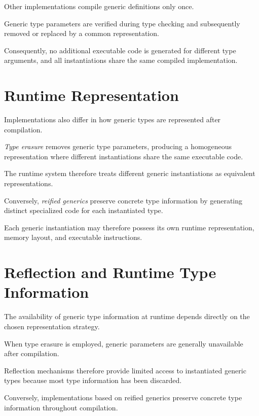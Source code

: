 \documentclass[11pt]{report}
\begin{document}
Other implementations compile generic definitions only once.

Generic type parameters are verified during type checking and subsequently
removed or replaced by a common representation.

Consequently, no additional executable code is generated for different type
arguments, and all instantiations share the same compiled implementation.




\section{Runtime Representation}
\label{Introduction:RuntimeRepresentation}

Implementations also differ in how generic types are represented after
compilation.

\emph{Type erasure} removes generic type parameters, producing a homogeneous
representation where different instantiations share the same executable code.

The runtime system therefore treats different generic instantiations as
equivalent representations.


Conversely, \emph{reified generics} preserve concrete type information by
generating distinct specialized code for each instantiated type.

Each generic instantiation may therefore possess its own runtime
representation, memory layout, and executable instructions.

\label{Introduction: Reflection and Runtime Type Information}
\section{Reflection and Runtime Type Information}

The availability of generic type information at runtime depends directly on the
chosen representation strategy.


When type erasure is employed, generic parameters are generally unavailable after
compilation.

Reflection mechanisms therefore provide limited access to instantiated generic
types because most type information has been discarded.


Conversely, implementations based on reified generics preserve concrete type
information throughout compilation.
\end{document}
